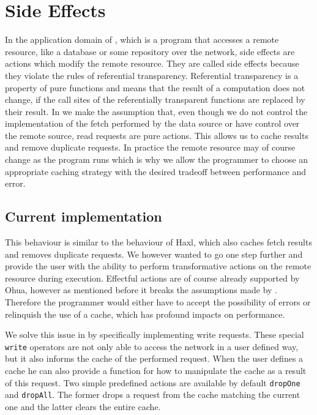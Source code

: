 \chapter{Side Effects}
\label{ch:side-effects}

In the application domain of \yauhau{}, which is a program that accesses a remote resource, like a database or some repository over the network, side effects are actions which modify the remote resource.
They are called side effects because they violate the rules of referential transparency.
Referential transparency is a property of pure functions and means that the result of a computation does not change, if the call sites of the referentially transparent functions are replaced by their result.
In \yauhau{} we make the assumption that, even though we do not control the implementation of the fetch performed by the data source or have control over the remote source, read requests are pure actions.
This allows us to cache results and remove duplicate requests.
In practice the remote resource may of course change as the program runs which is why we allow the programmer to choose an appropriate caching strategy with the desired tradeoff between performance and error.

\section{Current implementation}

This behaviour is similar to the behaviour of Haxl, which also caches fetch results and removes duplicate requests.
We however wanted to go one step further and provide the user with the ability to perform transformative actions on the remote resource during execution.
Effectful actions are of course already supported by Ohua, however as mentioned before it breaks the assumptions made by \yauhau{}.
Therefore the programmer would either have to accept the possibility of errors or relinquish the use of a cache, which has profound impacts on performance.

We solve this issue in \yauhau{} by specifically implementing write requests.
These special \texttt{write} operators are not only able to access the network in a user defined way, but it also informs the cache of the performed request.
When the user defines a cache he can also provide a function for how to manipulate the cache as a result of this request.
Two simple predefined actions are available by default \texttt{dropOne} and \texttt{dropAll}.
The former drops a request from the cache matching the current one and the latter clears the entire cache.

